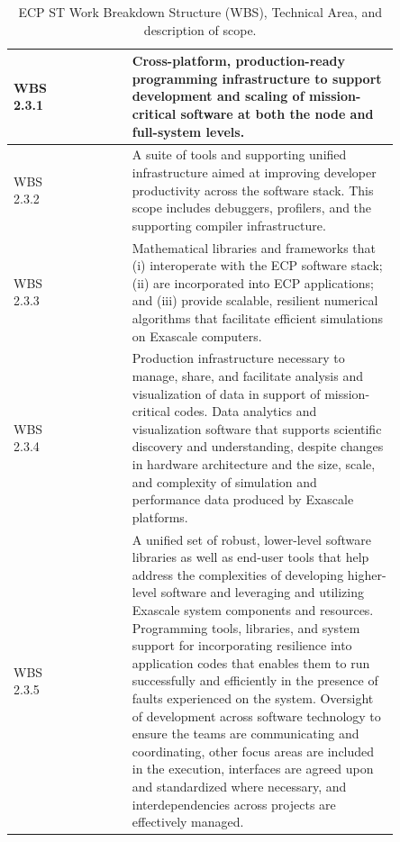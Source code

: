 \begin{table}
	\begin{tabular}{|>{\columncolor[gray]{0.8}}p{0.10\linewidth}|>{\columncolor[rgb]{0.88,1,1}}p{0.15\linewidth}|p{0.6\linewidth}|}\hline
	    \vfill WBS 2.3.1\vfill & \vfill \centering{Programming Models and Runtimes} \vfill & \vfill Cross-platform, production-ready programming infrastructure to support development and scaling of mission-critical software at both the node and full-system levels.\vfill \\\hline
		\vfill WBS 2.3.2 \vfill & \vfill \centering{Development Tools} \vfill & \vfill A suite of tools and supporting unified infrastructure aimed at improving developer productivity across the software stack. This scope includes debuggers, profilers, and the supporting compiler infrastructure.\vfill \\\hline
		\vfill WBS 2.3.3 \vfill & \vfill \centering{Mathematical Libraries} \vfill & \vfill Mathematical libraries and frameworks that (i) interoperate with the ECP software stack; (ii) are incorporated into ECP applications; and (iii) provide scalable, resilient numerical algorithms that facilitate efficient simulations on Exascale computers.\vfill \\\hline
		\vfill WBS 2.3.4 \vfill & \vfill \centering{Data and Visualization} \vfill & \vfill Production infrastructure necessary to manage, share, and facilitate analysis and visualization of data in support of mission-critical codes. Data analytics and visualization software that supports scientific discovery and understanding, despite changes in hardware architecture and the size, scale, and complexity of simulation and performance data produced by Exascale platforms. \vfill \\\hline
		\vfill WBS 2.3.5 \vfill & \vfill \centering{Software Ecosystem and Delivery} \vfill & \vfill A unified set of robust, lower-level software libraries as well as end-user tools that help address the complexities of developing higher-level software and leveraging and utilizing Exascale system components and resources. Programming tools, libraries, and system support for incorporating resilience into application codes that enables them to run successfully and efficiently in the presence of faults experienced on the system. Oversight of development across software technology to ensure the teams are communicating and coordinating, other focus areas are included in the execution, interfaces are agreed upon and standardized where necessary, and interdependencies across projects are effectively managed.\vfill \\\hline
	\end{tabular}
	\caption{\label{table:wbs} ECP ST Work Breakdown Structure (WBS), Technical Area, and description of scope.}
\end{table}

